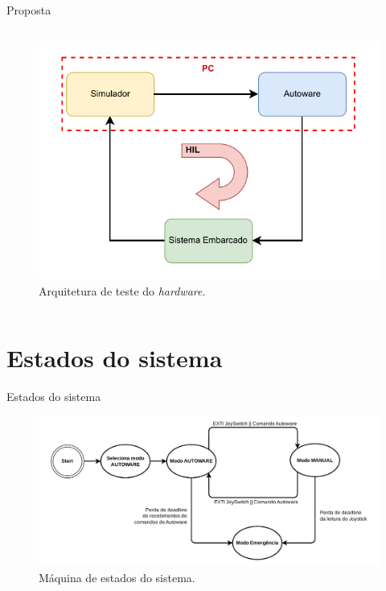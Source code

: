 \documentclass{if-beamer}
\begin{document}
\begin{frame}{Proposta}
\begin{columns}
\begin{column}{0.5\textwidth}
				\begin{figure}[H]
				\centering
				\includegraphics[width=\linewidth]{img/architecture_HIL}
				\caption{Arquitetura de teste do \textit{hardware}.}
				\label{fig:architecture_HIL}
			\end{figure}
			
		\end{column}
		
	\end{columns}
	
\end{frame}

\section{Estados do sistema}

\begin{frame}{Estados do sistema}
	
	
	\begin{figure}[H]
		\centering
		\includegraphics[width=\linewidth]{img/maquinadeestados}
		\caption{Máquina de estados do sistema.}
		\label{fig:maquinadeestados}
	\end{figure}
	
	
\end{frame}
\end{document}
